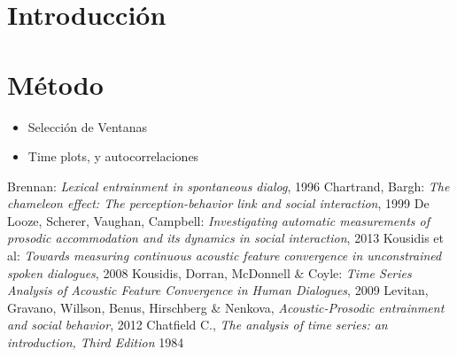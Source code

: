 \documentclass[11pt,a4paper,twoside]{tesis}
\begin{document}
\def\titulo{Licenciado }

\def\autor{Juan Manuel Pérez}
\def\tituloTesis{Mimetización entre interlocutores}
\def\runtitulo{Medición de la mimetización entre interlocutores utilizando series de tiempo}
\def\runtitle{Measuring entrainment between speakers using time series}
\def\director{Agustín Gravano}
\def\codirector{Ramiro Gálvez}
\def\lugar{Buenos Aires, 2015}


\frontmatter
\pagestyle{empty}



\tableofcontents

\mainmatter
\pagestyle{headings}


\chapter{Introducción}




\chapter{Método}


\begin{itemize}
\item Selección de Ventanas
\item Time plots, y autocorrelaciones
\end{itemize}

\backmatter
\begin{thebibliography}{9}
    Brennan:
    \emph{Lexical entrainment in spontaneous dialog},
    1996
    Chartrand, Bargh:
    \emph{The chameleon effect: The perception-behavior link and social interaction},
    1999
    De Looze, Scherer, Vaughan, Campbell:
    \emph{Investigating automatic measurements of prosodic accommodation and its dynamics in social interaction},
    2013
    Kousidis et al:
    \emph{Towards measuring continuous acoustic feature convergence in unconstrained spoken dialogues},
    2008
    Kousidis, Dorran, McDonnell \& Coyle:
    \emph{Time Series Analysis of Acoustic Feature Convergence in Human Dialogues},
    2009
    Levitan, Gravano, Willson, Benus, Hirschberg \& Nenkova,
    \emph{Acoustic-Prosodic entrainment and social behavior},
    2012
    Chatfield C.,
    \emph{The analysis of time series: an introduction, Third Edition}
    1984
\end{thebibliography}
\end{document}
